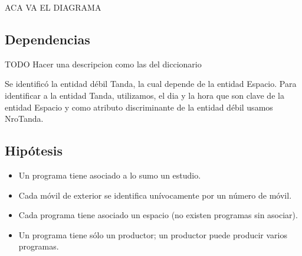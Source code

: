 \documentclass[a4paper,10pt,titlepage]{article}
\begin{document}
ACA VA EL DIAGRAMA

\pagebreak

\subsection{Dependencias}
TODO Hacer una descripcion como las del diccionario

Se identific\'o la entidad d\'ebil Tanda, la cual depende de la entidad Espacio.
Para identificar a la entidad Tanda, utilizamos, el dia y la hora que son clave de la entidad Espacio y como atributo discriminante de la entidad d\'ebil usamos NroTanda.

\pagebreak

\subsection{Hip\'otesis}
\begin{itemize}
\item Un programa tiene asociado a lo sumo un estudio.
\item Cada m\'ovil de exterior se identifica un\'ivocamente por un n\'umero de m\'ovil.
\item Cada programa tiene asociado un espacio (no existen programas sin asociar).
\item Un programa tiene s\'olo un productor; un productor puede producir varios programas.
\end{itemize}
\pagebreak
\end{document}
